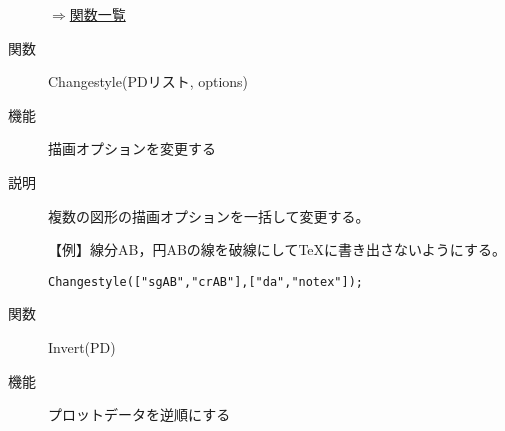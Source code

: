 \documentclass[papersize,a4paper,10pt,uplatex]{jsarticle}
\begin{document}
\begin{description}
%
%
%
%

\begin{flushright}\hyperlink{functionlist}{$\Rightarrow$関数一覧}\end{flushright}

\hypertarget{changestyle}{}
\item[関数]Changestyle(PDリスト, options)
\item[機能]描画オプションを変更する
\item[説明]複数の図形の描画オプションを一括して変更する。

\vspace{\baselineskip}
【例】線分AB，円ABの線を破線にして\TeX に書き出さないようにする。

\hspace{10mm} \verb|Changestyle(["sgAB","crAB"],["da","notex"]);|


\vspace{\baselineskip}
\hypertarget{invert}{}
\item[関数]Invert(PD)
\item[機能]プロットデータを逆順にする


\end{description}
\end{document}
